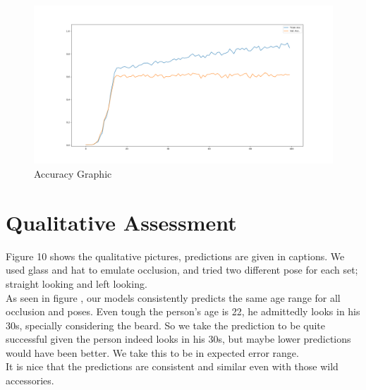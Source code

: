 \documentclass[conference,compsoc]{IEEEtran}
\begin{document}
\begin{figure}
  \includegraphics[width=\linewidth]{acc.png}
  \caption{Accuracy Graphic}
  \label{fig:boat1}
\end{figure}

\section{Qualitative Assessment}

Figure 10 shows the qualitative pictures, predictions are given in captions. We used glass and hat to emulate occlusion, and tried two different pose for each set; straight looking and left looking. \\

As seen in figure , our models consistently predicts the same age range for all occlusion and poses. Even tough the person's age is 22, he admittedly looks in his 30s, specially considering the beard. So we take the prediction to be quite successful given the person indeed looks in his 30s, but maybe lower predictions would have been better. We take this to be in expected error range. \\

It is nice that the predictions are consistent and similar even with those wild accessories. \\
\end{document}
